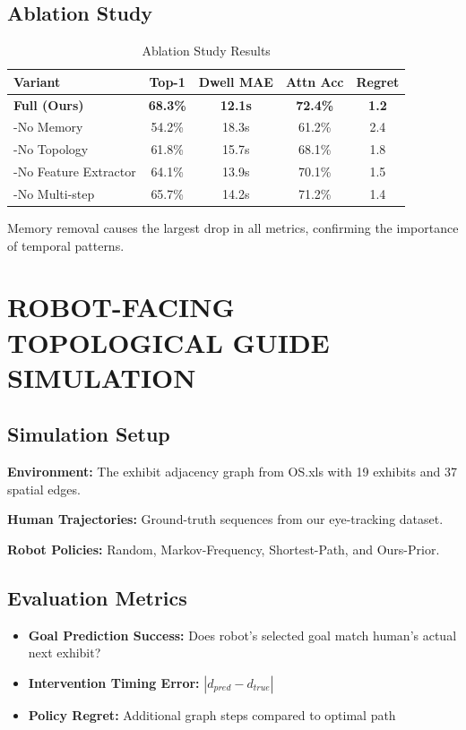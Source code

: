 \documentclass{article}
\begin{document}
\subsection{Ablation Study}

\begin{table}[h]
\centering
\caption{Ablation Study Results}
\begin{tabular}{lcccc}
\toprule
Variant & Top-1 & Dwell MAE & Attn Acc & Regret \\
\midrule
\textbf{Full (Ours)} & \textbf{68.3\%} & \textbf{12.1s} & \textbf{72.4\%} & \textbf{1.2} \\
-No Memory & 54.2\% & 18.3s & 61.2\% & 2.4 \\
-No Topology & 61.8\% & 15.7s & 68.1\% & 1.8 \\
-No Feature Extractor & 64.1\% & 13.9s & 70.1\% & 1.5 \\
-No Multi-step & 65.7\% & 14.2s & 71.2\% & 1.4 \\
\bottomrule
\end{tabular}
\end{table}

Memory removal causes the largest drop in all metrics, confirming the importance of temporal patterns.

\section{ROBOT-FACING TOPOLOGICAL GUIDE SIMULATION}

\subsection{Simulation Setup}

\textbf{Environment:} The exhibit adjacency graph from OS.xls with 19 exhibits and 37 spatial edges.

\textbf{Human Trajectories:} Ground-truth sequences from our eye-tracking dataset.

\textbf{Robot Policies:} Random, Markov-Frequency, Shortest-Path, and Ours-Prior.

\subsection{Evaluation Metrics}

\begin{itemize}
    \item \textbf{Goal Prediction Success:} Does robot's selected goal match human's actual next exhibit?
    \item \textbf{Intervention Timing Error:} $|d_{pred} - d_{true}|$
    \item \textbf{Policy Regret:} Additional graph steps compared to optimal path
\end{itemize}
\end{document}
